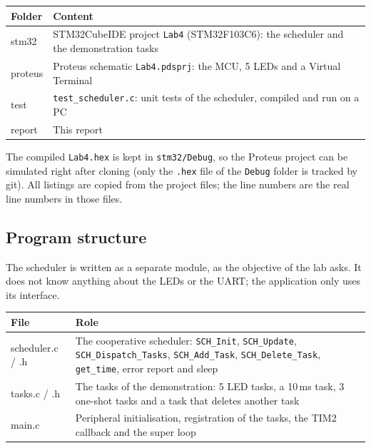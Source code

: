 \documentclass[12pt,a4paper]{article}
\numberwithin{figure}{section}
\numberwithin{table}{section}
\newcommand{\code}[1]{\texttt{#1}}
\begin{document}
\begin{center}
\begin{tabularx}{\linewidth}{>{\ttfamily}l X}
\toprule
\normalfont\textbf{Folder} & \textbf{Content}\\
\midrule
stm32 & STM32CubeIDE project \code{Lab4} (STM32F103C6): the scheduler and the demonstration tasks\\
proteus & Proteus schematic \code{Lab4.pdsprj}: the MCU, 5 LEDs and a Virtual Terminal\\
test & \code{test\_scheduler.c}: unit tests of the scheduler, compiled and run on a PC\\
report & This report\\
\bottomrule
\end{tabularx}
\end{center}

The compiled \code{Lab4.hex} is kept in \code{stm32/Debug}, so the Proteus project can be simulated right after cloning (only the \code{.hex} file of the \code{Debug} folder is tracked by git). All listings are copied from the project files; the line numbers are the real line numbers in those files.

\subsection{Program structure}
The scheduler is written as a separate module, as the objective of the lab asks. It does not know anything about the LEDs or the UART; the application only uses its interface.

\begin{center}
\begin{tabularx}{\linewidth}{>{\ttfamily}l X}
\toprule
\normalfont\textbf{File} & \textbf{Role}\\
\midrule
scheduler.c / .h & The cooperative scheduler: \code{SCH\_Init}, \code{SCH\_Update}, \code{SCH\_Dispatch\_Tasks}, \code{SCH\_Add\_Task}, \code{SCH\_Delete\_Task}, \code{get\_time}, error report and sleep\\
tasks.c / .h & The tasks of the demonstration: 5 LED tasks, a 10\,ms task, 3 one-shot tasks and a task that deletes another task\\
main.c & Peripheral initialisation, registration of the tasks, the TIM2 callback and the super loop\\
\bottomrule
\end{tabularx}
\end{center}
\end{document}
